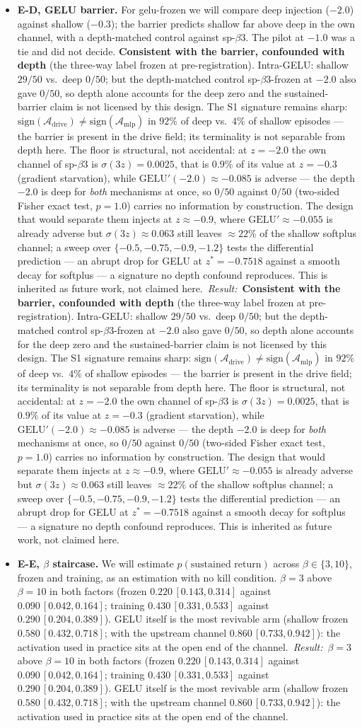 \documentclass[11pt]{article}
\makeatletter
\theoremstyle{definition}
\theoremstyle{remark}
\newcommand{\@eresempty}{}
\newcommand{\eresult}[1]{%
  \def\@erestmp{#1}%
  \ifx\@erestmp\@eresempty\else\ \textit{Result:}~#1\fi}
\makeatother
\begin{document}
\begin{itemize}
{sustained returns, $\hat p=0.440\,[0.300,0.587]$, $3.7\times$ the gate
$n^\ast=6$; the area of the leader drive opened before the return in $21/22$
of them. The memory gate of the theorem operates in a transformer FFN through
the own channel.}
\item \textbf{E-D, GELU barrier.} For gelu-frozen we will compare deep injection
($-2.0$) against shallow ($-0.3$); the barrier predicts shallow far above deep in
the own channel, with a depth-matched control against sp-$\beta3$. The pilot at
$-1.0$ was a tie and did not decide.\eresult{\textbf{Consistent with the
barrier, confounded with depth} (the three-way label frozen at
pre-registration). Intra-GELU: shallow $29/50$ vs.\ deep $0/50$; but the
depth-matched control sp-$\beta3$-frozen at $-2.0$ also gave $0/50$, so depth
alone accounts for the deep zero and the sustained-barrier claim is not
licensed by this design. The S1 signature remains sharp:
$\mathrm{sign}(\mathcal A_{\mathrm{drive}})\neq\mathrm{sign}(\mathcal
A_{\mathrm{mlp}})$ in $92\%$ of deep vs.\ $4\%$ of shallow episodes --- the
barrier is present in the drive field; its terminality is not separable from
depth here. The floor is structural, not accidental: at $z=-2.0$ the own
channel of sp-$\beta3$ is $\sigma(3z)=0.0025$, that is $0.9\%$ of its value at
$z=-0.3$ (gradient starvation), while $\mathrm{GELU}'(-2.0)\approx-0.085$ is
adverse --- the depth $-2.0$ is deep for \emph{both} mechanisms at once, so
$0/50$ against $0/50$ (two-sided Fisher exact test, $p=1.0$) carries no
information by construction. The design that would separate them injects at
$z\approx-0.9$, where $\mathrm{GELU}'\approx-0.055$ is already adverse but
$\sigma(3z)\approx0.063$ still leaves $\approx22\%$ of the shallow softplus
channel; a sweep over $\{-0.5,-0.75,-0.9,-1.2\}$ tests the differential
prediction --- an abrupt drop for GELU at $z^\ast=-0.7518$ against a smooth
decay for softplus --- a signature no depth confound reproduces. This is
inherited as future work, not claimed here.}
\item \textbf{E-E, $\beta$ staircase.} We will estimate
$p(\text{sustained return})$ across $\beta\in\{3,10\}$, frozen and training, as
an estimation with no kill condition.\eresult{$\beta=3$ above $\beta=10$ in
both factors (frozen
$0.220\,[0.143,0.314]$ against $0.090\,[0.042,0.164]$; training
$0.430\,[0.331,0.533]$ against $0.290\,[0.204,0.389]$). GELU itself is the
most revivable arm (shallow frozen
$0.580\,[0.432,0.718]$; with the upstream channel
$0.860\,[0.733,0.942]$): the activation used in practice sits at the open end
of the channel.}
\end{itemize}
\end{document}
